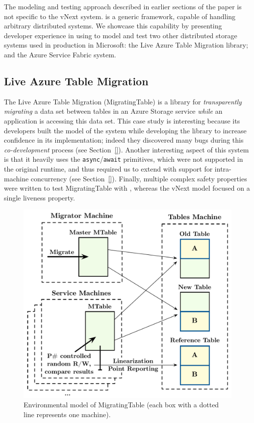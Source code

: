 The modeling and testing approach described in earlier sections of the paper is not specific to the vNext system. \psharp is a generic framework, capable of handling arbitrary distributed systems. We showcase this capability by presenting developer experience in using \psharp to model and test two other distributed storage systems used in production in Microsoft: the Live Azure Table Migration library; and the Azure Service Fabric system.

\subsection{Live Azure Table Migration}
\label{sec:cases:migration}

The Live Azure Table Migration (MigratingTable) is a library for
\emph{transparently migrating} a data set between tables in an Azure Storage
service \emph{while} an application is accessing this data set. This case study
is interesting because its developers built the \psharp model of the system
while developing the library to increase confidence in its implementation;
indeed they discovered many bugs during this \emph{co-development} process (see
Section~\ref{}). Another interesting aspect of this system is that it heavily
uses the \texttt{async}/\texttt{await} primitives, which were not supported in
the original \psharp runtime, and thus required us to extend \psharp with
support for intra-machine concurrency (see Section~\ref{}). Finally, multiple 
complex safety properties were written to test MigratingTable with \psharp, 
whereas the vNext model focused on a single liveness property.

\begin{figure}[t]
\centering
\includegraphics[width=\linewidth]{img/mocked_migration}
\caption{Environmental model of MigratingTable (each box with a dotted line represents one \psharp machine).}
\label{fig:mockedmigration}
\end{figure}


